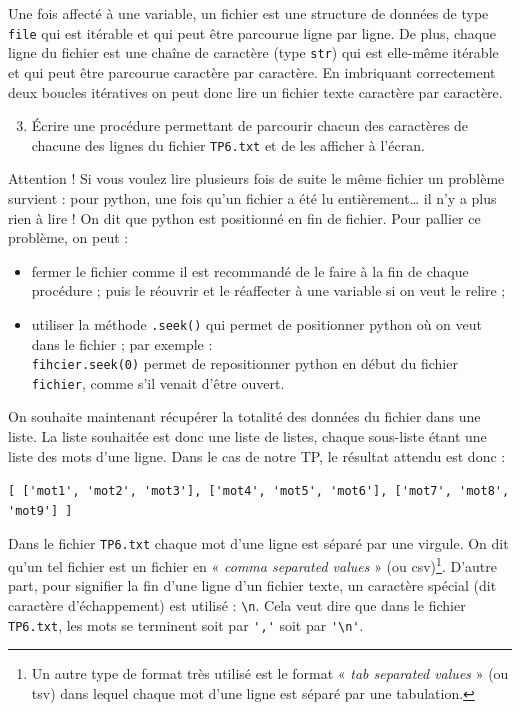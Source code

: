 Une fois affecté à une variable, un fichier est une structure de données de type \verb|file| qui est itérable et qui peut être parcourue ligne par ligne. De plus, chaque ligne du fichier est une chaîne de caractère (type \verb|str|) qui est elle-même itérable et qui peut être parcourue caractère par caractère. En imbriquant correctement deux boucles itératives on peut donc lire un fichier texte caractère par caractère.

\begin{enumerate}
\setcounter{enumi}{2}
\item Écrire une procédure permettant de parcourir chacun des caractères de chacune des lignes du fichier \verb|TP6.txt| et de les afficher à l'écran.
\end{enumerate}

Attention ! Si vous voulez lire plusieurs fois de suite le même fichier un problème survient : pour python, une fois qu'un fichier a été lu entièrement{\dots} il n'y a plus rien à lire ! On dit que python est positionné en fin de fichier. Pour pallier ce problème, on peut :
\begin{itemize}
 \item fermer le fichier comme il est recommandé de le faire à la fin de chaque procédure ; puis le réouvrir et le réaffecter à une variable si on veut le relire ; 
 \item utiliser la méthode \verb|.seek()| qui permet de positionner python où on veut dans le fichier ; par exemple :\\
 \verb|fihcier.seek(0)| permet de repositionner python en début du fichier \verb|fichier|, comme s'il venait d'être ouvert.
\end{itemize}

On souhaite maintenant récupérer la totalité des données du fichier dans une liste. La liste souhaitée est donc une liste de listes, chaque sous-liste étant une liste des mots d'une ligne. Dans le cas de notre TP, le résultat attendu est donc :
\begin{center}
\verb|[ ['mot1', 'mot2', 'mot3'], ['mot4', 'mot5', 'mot6'], ['mot7', 'mot8', 'mot9'] ]|
\end{center}

Dans le fichier \verb|TP6.txt| chaque mot d'une ligne est séparé par une virgule. On dit qu'un tel fichier est un fichier en « \textit{comma separated values} » (ou csv)\footnote{Un autre type de format très utilisé est le format « \textit{tab separated values} » (ou tsv)  dans lequel chaque mot d'une ligne est séparé par une tabulation.}. D'autre part, pour signifier la fin d'une ligne d'un fichier texte, un caractère spécial (dit caractère d'échappement) est utilisé : \verb|\n|. Cela veut dire que dans le fichier \verb|TP6.txt|, les mots se terminent soit par \verb|','| soit par \verb|'\n'|.

